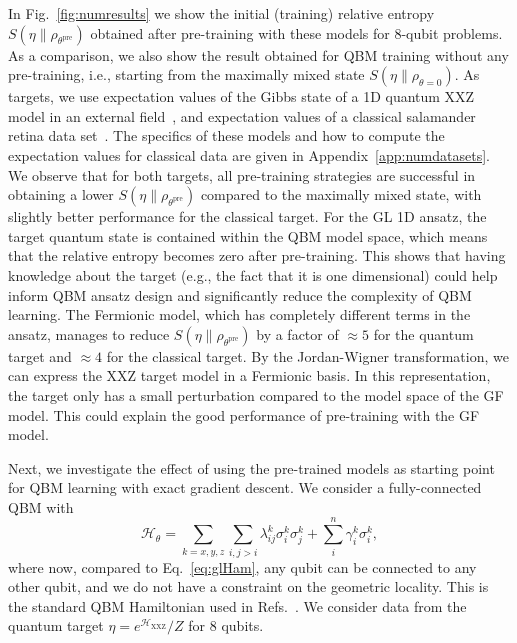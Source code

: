 \documentclass[
    aps,
    prx,
    floatfix,
    nofootinbib,
    onecolumn
]{revtex4-2}
\begin{document}
In Fig.~\ref{fig:numresults} we show the initial (training) relative entropy $S(\eta\|\rho_{\theta^{\mathrm{pre}}})$ obtained after pre-training with these models for 8-qubit problems. As a comparison, we also show the result obtained for QBM training without any pre-training, i.e., starting from the maximally mixed state $S(\eta\|\rho_{\theta=0})$. As targets, we use expectation values of the Gibbs state of a 1D quantum XXZ model in an external field~\cite{Heisenberg1928, Franchini_2017}, and expectation values of a classical salamander retina data set~\cite{Tkacik2014}. The specifics of these models and how to compute the expectation values for classical data are given in Appendix~\ref{app:numdatasets}. We observe that for both targets, all pre-training strategies are successful in obtaining a lower $S(\eta\|\rho_{\theta^{\mathrm{pre}}})$ compared to the maximally mixed state, with slightly better performance for the classical target. For the GL 1D ansatz, the target quantum state is contained within the QBM model space, which means that the relative entropy becomes zero after pre-training. This shows that having knowledge about the target (e.g., the fact that it is one dimensional) could help inform QBM ansatz design and significantly reduce the complexity of QBM learning. The Fermionic model, which has completely different terms in the ansatz, manages to reduce $S(\eta\|\rho_{\theta^{\mathrm{pre}}})$ by a factor of $\approx 5$ for the quantum target and $\approx 4$ for the classical target. By the Jordan-Wigner transformation, we can express the XXZ target model in a Fermionic basis. In this representation, the target only has a small perturbation compared to the model space of the GF model. This could explain the good performance of pre-training with the GF model. 

Next, we investigate the effect of using the pre-trained models as starting point for QBM learning with exact gradient descent. We consider a fully-connected QBM with 
\begin{equation} 
\label{eq:fully_connect_qbm}
\mathcal{H}_\theta = \sum_{k=x,y,z}\sum_{i, j>i}\lambda^k_{ij}\sigma_i^k\sigma^k_j + \sum_i^n \gamma^k_i\sigma^k_i,
\end{equation} 
where now, compared to Eq.~\eqref{eq:glHam}, any qubit can be connected to any other qubit, and we do not have a constraint on the geometric locality. This is the standard QBM Hamiltonian used in Refs.~\cite{Kappen_2020, Coopmans_2023}. We consider data from the quantum target $\eta = e^{{\mathcal{H}_\mathrm{XXZ}}}/Z$ for $8$ qubits.
\end{document}
